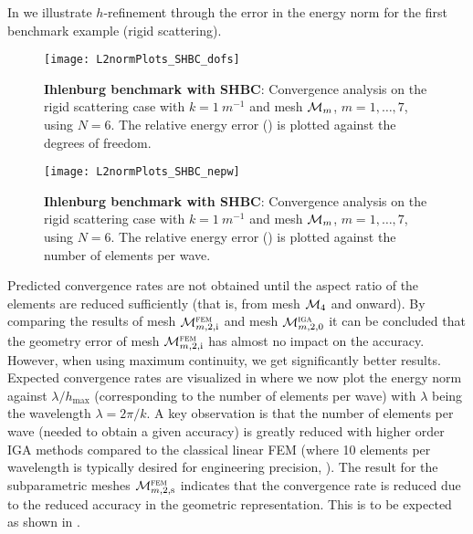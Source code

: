 In  we illustrate $h$-refinement through the error in the energy norm for the first benchmark example (rigid scattering).
\begin{figure}
	\centering
	\texttt{[image: L2normPlots\_SHBC\_dofs]}
	\caption{\textbf{Ihlenburg benchmark with SHBC}: Convergence analysis on the rigid scattering case with $k=\SI{1}{m^{-1}}$ and mesh ${\cal M}_m$, $m=1,\dots,7$, using $N=6$. The relative energy error () is plotted against the degrees of freedom.}
	\label{Fig2:EnergyErrorPlotsDofs}
	\par\bigskip
	\texttt{[image: L2normPlots\_SHBC\_nepw]}
	\caption{\textbf{Ihlenburg benchmark with SHBC}: Convergence analysis on the rigid scattering case with $k=\SI{1}{m^{-1}}$ and mesh ${\cal M}_m$, $m=1,\dots,7$, using $N=6$. The relative energy error () is plotted against the number of elements per wave.}
	\label{Fig2:EnergyErrorPlotsh}
\end{figure}
Predicted convergence rates are not obtained until the aspect ratio of the elements are reduced sufficiently (that is, from mesh ${\cal M}_4$ and onward). By comparing the results of mesh ${\cal M}_{m,2,\mathrm{i}}^{\textsc{fem}}$ and mesh ${\cal M}_{m,2,0}^{\textsc{iga}}$ it can be concluded that the geometry error of mesh ${\cal M}_{m,2,\mathrm{i}}^{\textsc{fem}}$ has almost no impact on the accuracy. However, when using maximum continuity, we get significantly better results. Expected convergence rates are visualized in  where we now plot the energy norm against $\lambda/h_{\mathrm{max}}$ (corresponding to the number of elements per wave) with $\lambda$ being the wavelength $\lambda=2\pi/k$. A key observation is that the number of elements per wave (needed to obtain a given accuracy) is greatly reduced with higher order IGA methods compared to the classical linear FEM (where 10 elements per wavelength is typically desired for engineering precision, \cite[p. 182]{Ihlenburg1998fea}). The result for the subparametric meshes ${\cal M}_{m,2,\mathrm{s}}^{\textsc{fem}}$ indicates that the convergence rate is reduced due to the reduced accuracy in the geometric representation. This is to be expected as shown in \cite[p. 202]{Strang1973aao}.

